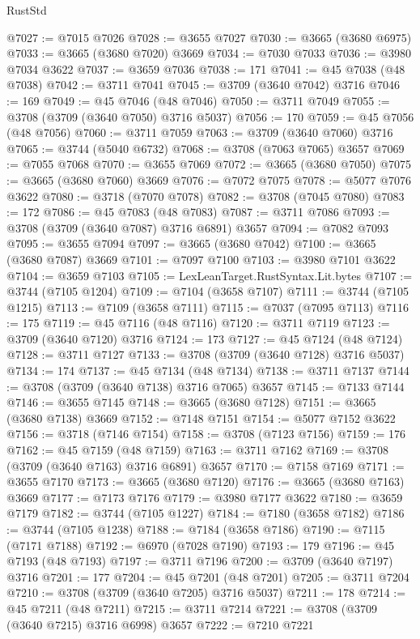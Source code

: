 \begin{lexlean}{RustStd}
\begin{coremodule}
@7027 := @7015 @7026
@7028 := @3655 @7027
@7030 := @3665 (@3680 @6975)
@7033 := @3665 (@3680 @7020) @3669
@7034 := @7030 @7033
@7036 := @3980 @7034 @3622
@7037 := @3659 @7036
@7038 := 171
@7041 := @45 @7038 (@48 @7038)
@7042 := @3711 @7041
@7045 := @3709 (@3640 @7042) @3716
@7046 := 169
@7049 := @45 @7046 (@48 @7046)
@7050 := @3711 @7049
@7055 := @3708 (@3709 (@3640 @7050) @3716 @5037)
@7056 := 170
@7059 := @45 @7056 (@48 @7056)
@7060 := @3711 @7059
@7063 := @3709 (@3640 @7060) @3716
@7065 := @3744 (@5040 @6732)
@7068 := @3708 (@7063 @7065) @3657
@7069 := @7055 @7068
@7070 := @3655 @7069
@7072 := @3665 (@3680 @7050)
@7075 := @3665 (@3680 @7060) @3669
@7076 := @7072 @7075
@7078 := @5077 @7076 @3622
@7080 := @3718 (@7070 @7078)
@7082 := @3708 (@7045 @7080)
@7083 := 172
@7086 := @45 @7083 (@48 @7083)
@7087 := @3711 @7086
@7093 := @3708 (@3709 (@3640 @7087) @3716 @6891) @3657
@7094 := @7082 @7093
@7095 := @3655 @7094
@7097 := @3665 (@3680 @7042)
@7100 := @3665 (@3680 @7087) @3669
@7101 := @7097 @7100
@7103 := @3980 @7101 @3622
@7104 := @3659 @7103
@7105 := LexLeanTarget.RustSyntax.Lit.bytes
@7107 := @3744 (@7105 @1204)
@7109 := @7104 (@3658 @7107)
@7111 := @3744 (@7105 @1215)
@7113 := @7109 (@3658 @7111)
@7115 := @7037 (@7095 @7113)
@7116 := 175
@7119 := @45 @7116 (@48 @7116)
@7120 := @3711 @7119
@7123 := @3709 (@3640 @7120) @3716
@7124 := 173
@7127 := @45 @7124 (@48 @7124)
@7128 := @3711 @7127
@7133 := @3708 (@3709 (@3640 @7128) @3716 @5037)
@7134 := 174
@7137 := @45 @7134 (@48 @7134)
@7138 := @3711 @7137
@7144 := @3708 (@3709 (@3640 @7138) @3716 @7065) @3657
@7145 := @7133 @7144
@7146 := @3655 @7145
@7148 := @3665 (@3680 @7128)
@7151 := @3665 (@3680 @7138) @3669
@7152 := @7148 @7151
@7154 := @5077 @7152 @3622
@7156 := @3718 (@7146 @7154)
@7158 := @3708 (@7123 @7156)
@7159 := 176
@7162 := @45 @7159 (@48 @7159)
@7163 := @3711 @7162
@7169 := @3708 (@3709 (@3640 @7163) @3716 @6891) @3657
@7170 := @7158 @7169
@7171 := @3655 @7170
@7173 := @3665 (@3680 @7120)
@7176 := @3665 (@3680 @7163) @3669
@7177 := @7173 @7176
@7179 := @3980 @7177 @3622
@7180 := @3659 @7179
@7182 := @3744 (@7105 @1227)
@7184 := @7180 (@3658 @7182)
@7186 := @3744 (@7105 @1238)
@7188 := @7184 (@3658 @7186)
@7190 := @7115 (@7171 @7188)
@7192 := @6970 (@7028 @7190)
@7193 := 179
@7196 := @45 @7193 (@48 @7193)
@7197 := @3711 @7196
@7200 := @3709 (@3640 @7197) @3716
@7201 := 177
@7204 := @45 @7201 (@48 @7201)
@7205 := @3711 @7204
@7210 := @3708 (@3709 (@3640 @7205) @3716 @5037)
@7211 := 178
@7214 := @45 @7211 (@48 @7211)
@7215 := @3711 @7214
@7221 := @3708 (@3709 (@3640 @7215) @3716 @6998) @3657
@7222 := @7210 @7221

\end{coremodule}
\end{lexlean}
